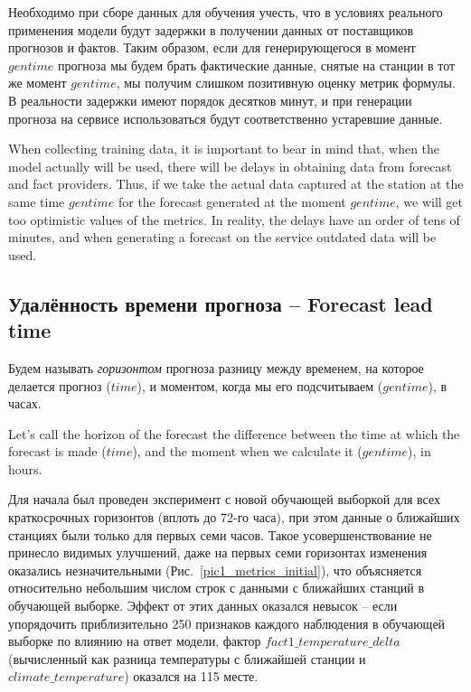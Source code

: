 \documentclass[14pt]{matmex-diploma}
\begin{document}
Необходимо при сборе данных для обучения учесть, что в условиях реального применения модели будут задержки в получении данных от поставщиков прогнозов и фактов. Таким образом, если для генерирующегося в момент $gentime$ прогноза мы будем брать фактические данные, снятые на станции в тот же момент $gentime$, мы получим слишком позитивную оценку метрик формулы. В реальности задержки имеют порядок десятков минут, и при генерации прогноза на сервисе использоваться будут соответственно устаревшие данные.


When collecting training data, it is important to bear in mind that, when the model actually will be used, there will be delays in obtaining data from forecast and fact providers. Thus, if we take the actual data captured at the station at the same time $gentime$ for the forecast generated at the moment $gentime$, we will get too optimistic values of the metrics. In reality, the delays have an order of tens of minutes, and when generating a forecast on the service outdated data will be used.




\subsection{Удалённость времени прогноза -- Forecast lead time}

Будем называть \textit{горизонтом} прогноза разницу между временем, на которое делается прогноз ($time$), и моментом, когда мы его подсчитываем ($gentime$), в часах.

Let's call the horizon of the forecast the difference between the time at which the forecast is made ($time$), and the moment when we calculate it ($gentime$), in hours.

Для начала был проведен эксперимент с новой обучающей выборкой для всех краткосрочных горизонтов (вплоть до 72-го часа), при этом данные о ближайших станциях были только для первых семи часов. Такое усовершенствование не принесло видимых улучшений, даже на первых семи горизонтах изменения оказались незначительными (Рис.~\ref{pic1_metrics_initial}), что объясняется относительно небольшим числом строк с данными с ближайших станций в обучающей выборке. Эффект от этих данных оказался невысок -- если упорядочить приблизительно 250 признаков каждого наблюдения в обучающей выборке по влиянию на ответ модели, фактор $fact1\_temperature\_delta$ (вычисленный как разница температуры с ближайшей станции и $climate\_temperature$) оказался на 115 месте.
\end{document}

